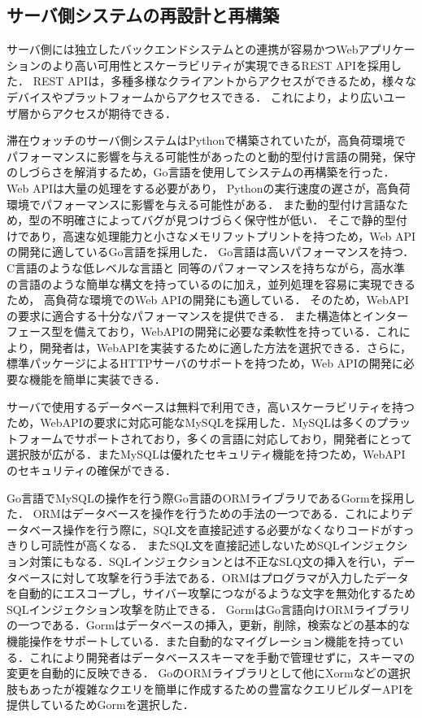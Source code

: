 



\subsection{サーバ側システムの再設計と再構築}\label{4.1.1}
サーバ側には独立したバックエンドシステムとの連携が容易かつWebアプリケーションのより高い可用性とスケーラビリティが実現できるREST APIを採用した．
REST APIは，多種多様なクライアントからアクセスができるため，様々なデバイスやプラットフォームからアクセスできる．
これにより，より広いユーザ層からアクセスが期待できる．


滞在ウォッチのサーバ側システムはPythonで構築されていたが，高負荷環境でパフォーマンスに影響を与える可能性があったのと動的型付け言語の開発，保守のしづらさを解消するため，Go言語を使用してシステムの再構築を行った．
Web APIは大量の処理をする必要があり，
Pythonの実行速度の遅さが，高負荷環境でパフォーマンスに影響を与える可能性がある．
また動的型付け言語なため，型の不明確さによってバグが見つけづらく保守性が低い．
そこで静的型付けであり，高速な処理能力と小さなメモリフットプリントを持つため，Web APIの開発に適しているGo言語を採用した．
Go言語は高いパフォーマンスを持つ．C言語のような低レベルな言語と
同等のパフォーマンスを持ちながら，高水準の言語のような簡単な構文を持っているのに加え，並列処理を容易に実現できるため，
高負荷な環境でのWeb APIの開発にも適している．
そのため，WebAPIの要求に適合する十分なパフォーマンスを提供できる．
また構造体とインターフェース型を備えており，WebAPIの開発に必要な柔軟性を持っている．これにより，開発者は，WebAPIを実装するために適した方法を選択できる．さらに，標準パッケージによるHTTPサーバのサポートを持つため，Web APIの開発に必要な機能を簡単に実装できる．

サーバで使用するデータベースは無料で利用でき，高いスケーラビリティを持つため，WebAPIの要求に対応可能なMySQLを採用した．MySQLは多くのプラットフォームでサポートされており，多くの言語に対応しており，開発者にとって選択肢が広がる．またMySQLは優れたセキュリティ機能を持つため，WebAPIのセキュリティの確保ができる．

Go言語でMySQLの操作を行う際Go言語のORMライブラリであるGormを採用した．
ORMはデータベースを操作を行うための手法の一つである．これによりデータベース操作を行う際に，SQL文を直接記述する必要がなくなりコードがすっきりし可読性が高くなる．
またSQL文を直接記述しないためSQLインジェクション対策にもなる．SQLインジェクションとは不正なSLQ文の挿入を行い，データベースに対して攻撃を行う手法である．ORMはプログラマが入力したデータを自動的にエスコープし，サイバー攻撃につながるような文字を無効化するためSQLインジェクション攻撃を防止できる．
GormはGo言語向けORMライブラリの一つである．Gormはデータベースの挿入，更新，削除，検索などの基本的な機能操作をサポートしている．また自動的なマイグレーション機能を持っている．これにより開発者はデータベーススキーマを手動で管理せずに，スキーマの変更を自動的に反映できる．
GoのORMライブラリとして他にXormなどの選択肢もあったが複雑なクエリを簡単に作成するための豊富なクエリビルダーAPIを提供しているためGormを選択した．

